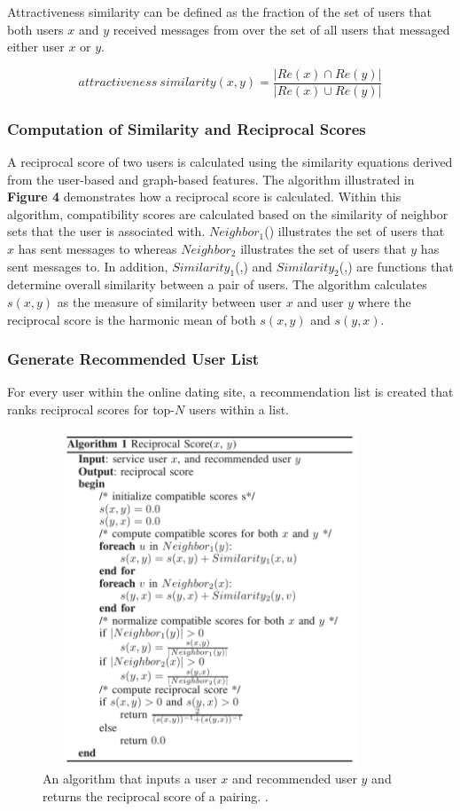 \documentclass[11pt]{article}
\begin{document}
Attractiveness similarity can be defined as the fraction of the set of users that both users $x$ and $y$ received messages from over the set of all users that messaged either user $x$ or $y$.

\begin{equation}
    attractiveness\ similarity(x,y) = \frac{\lvert Re(x) \cap Re(y) \rvert}{\lvert Re(x) \cup Re(y) \rvert}
\end{equation}


\subsubsection{Computation of Similarity and  Reciprocal Scores}
A reciprocal score of two users is calculated using the similarity equations derived from the user-based and graph-based features. The algorithm illustrated in \textbf{Figure 4} demonstrates how a reciprocal score is calculated.
Within this algorithm, compatibility scores are calculated based on the similarity of neighbor sets that the user is associated with. $Neighbor_1$() illustrates the  set of users that $x$ has sent messages to whereas $Neighbor_2$ illustrates the set of users that $y$ has sent messages to. In addition, $Similarity_1$(,) and $Similarity_2$(,) are functions that determine overall similarity between a pair of users. The algorithm calculates $s(x, y)$ as the measure of similarity between user $x$ and user $y$ where the reciprocal score is the harmonic mean of both $s(x,y)$ and $s(y,x)$.

\subsubsection{Generate Recommended User List} For every user within the online dating site, a recommendation list is created that ranks reciprocal scores for top-$N$ users within a list.

\begin{figure}[h]
\begin{center}
\includegraphics[width=10cm,height=10cm,keepaspectratio]{Recip_Alg1.png} 
\caption{An algorithm that inputs a user $x$ and recommended user $y$ and returns the reciprocal score of a pairing. \cite{recip}.} 
\end{center}
\end{figure}
\end{document}
